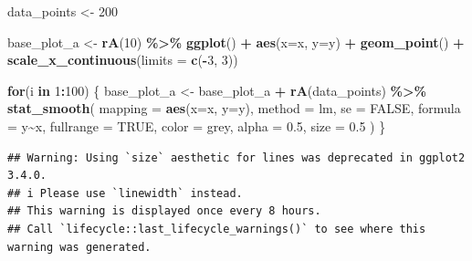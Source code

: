 \documentclass[
]{book}
\newenvironment{Shaded}{\begin{snugshade}}{\end{snugshade}}
\newcommand{\AttributeTok}[1]{\textcolor[rgb]{0.13,0.29,0.53}{#1}}
\newcommand{\ConstantTok}[1]{\textcolor[rgb]{0.56,0.35,0.01}{#1}}
\newcommand{\ControlFlowTok}[1]{\textcolor[rgb]{0.13,0.29,0.53}{\textbf{#1}}}
\newcommand{\DecValTok}[1]{\textcolor[rgb]{0.00,0.00,0.81}{#1}}
\newcommand{\FloatTok}[1]{\textcolor[rgb]{0.00,0.00,0.81}{#1}}
\newcommand{\FunctionTok}[1]{\textcolor[rgb]{0.13,0.29,0.53}{\textbf{#1}}}
\newcommand{\NormalTok}[1]{#1}
\newcommand{\OtherTok}[1]{\textcolor[rgb]{0.56,0.35,0.01}{#1}}
\newcommand{\SpecialCharTok}[1]{\textcolor[rgb]{0.81,0.36,0.00}{\textbf{#1}}}
\newcommand{\StringTok}[1]{\textcolor[rgb]{0.31,0.60,0.02}{#1}}
\theoremstyle{definition}
\theoremstyle{definition}
\theoremstyle{definition}
\theoremstyle{definition}
\theoremstyle{remark}
\begin{document}
\begin{Shaded}
\begin{Highlighting}[]
\NormalTok{data\_points }\OtherTok{\textless{}{-}} \DecValTok{200}

\NormalTok{base\_plot\_a }\OtherTok{\textless{}{-}} \FunctionTok{rA}\NormalTok{(}\DecValTok{10}\NormalTok{) }\SpecialCharTok{\%\textgreater{}\%}  
  \FunctionTok{ggplot}\NormalTok{() }\SpecialCharTok{+} 
  \FunctionTok{aes}\NormalTok{(}\AttributeTok{x=}\NormalTok{x, }\AttributeTok{y=}\NormalTok{y) }\SpecialCharTok{+} 
  \FunctionTok{geom\_point}\NormalTok{() }\SpecialCharTok{+} 
  \FunctionTok{scale\_x\_continuous}\NormalTok{(}\AttributeTok{limits =} \FunctionTok{c}\NormalTok{(}\SpecialCharTok{{-}}\DecValTok{3}\NormalTok{, }\DecValTok{3}\NormalTok{))}

\ControlFlowTok{for}\NormalTok{(i }\ControlFlowTok{in} \DecValTok{1}\SpecialCharTok{:}\DecValTok{100}\NormalTok{) \{ }
\NormalTok{    base\_plot\_a }\OtherTok{\textless{}{-}}\NormalTok{ base\_plot\_a }\SpecialCharTok{+} \FunctionTok{rA}\NormalTok{(data\_points) }\SpecialCharTok{\%\textgreater{}\%} 
      \FunctionTok{stat\_smooth}\NormalTok{(}
        \AttributeTok{mapping =} \FunctionTok{aes}\NormalTok{(}\AttributeTok{x=}\NormalTok{x, }\AttributeTok{y=}\NormalTok{y), }
        \AttributeTok{method  =} \StringTok{\textquotesingle{}lm\textquotesingle{}}\NormalTok{,         }\AttributeTok{se =} \ConstantTok{FALSE}\NormalTok{, }
        \AttributeTok{formula =} \StringTok{\textquotesingle{}y\textasciitilde{}x\textquotesingle{}}\NormalTok{, }\AttributeTok{fullrange =} \ConstantTok{TRUE}\NormalTok{,}
        \AttributeTok{color   =} \StringTok{\textquotesingle{}grey\textquotesingle{}}\NormalTok{,    }\AttributeTok{alpha =} \FloatTok{0.5}\NormalTok{,}
        \AttributeTok{size    =} \FloatTok{0.5}
\NormalTok{      )}
\NormalTok{\}}
\end{Highlighting}
\end{Shaded}

\begin{verbatim}
## Warning: Using `size` aesthetic for lines was deprecated in ggplot2 3.4.0.
## i Please use `linewidth` instead.
## This warning is displayed once every 8 hours.
## Call `lifecycle::last_lifecycle_warnings()` to see where this warning was generated.
\end{verbatim}
\end{document}
